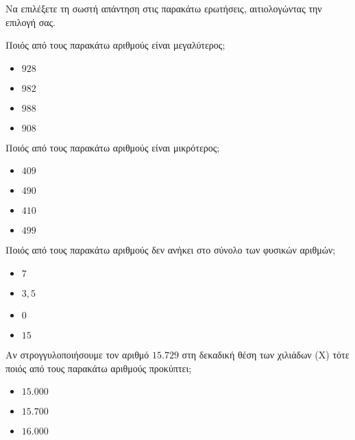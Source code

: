 Να επιλέξετε τη σωστή απάντηση στις παρακάτω ερωτήσεις, αιτιολογώντας την επιλογή σας.
\begin{rlist}
\item Ποιός από τους παρακάτω αριθμούς είναι μεγαλύτερος;
\begin{multicols}{4}
\begin{itemize}
\item $ 928 $
\item $ 982 $
\item $ 988 $
\item $ 908 $
\end{itemize}
\end{multicols}
\vspace{-3mm}
\item Ποιός από τους παρακάτω αριθμούς είναι μικρότερος;
\begin{multicols}{4}
\begin{itemize}
\item $ 409 $
\item $ 490 $
\item $ 410 $
\item $ 499 $
\end{itemize}
\end{multicols}
\vspace{-3mm}
\item Ποιός από τους παρακάτω αριθμούς δεν ανήκει στο σύνολο των φυσικών αριθμών;
\begin{multicols}{4}
\begin{itemize}
\item $ 7 $
\item $ 3{,}5 $
\item $ 0 $
\item $ 15 $
\end{itemize}
\end{multicols}
\item Αν στρογγυλοποιήσουμε τον αριθμό $ 15.729 $ στη δεκαδική θέση των χιλιάδων (Χ) τότε ποιός από τους παρακάτω αριθμούς προκύπτει;
\begin{multicols}{3}
\begin{itemize}
\item $ 15.000 $
\item $ 15.700 $
\item $ 16.000 $
\end{itemize}
\end{multicols}
\end{rlist}
